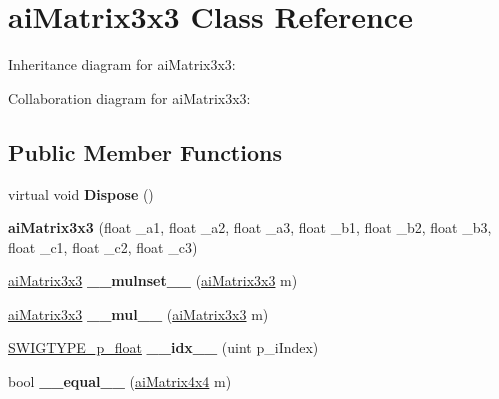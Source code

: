 \hypertarget{structai_matrix3x3}{\section{ai\+Matrix3x3 Class Reference}
\label{structai_matrix3x3}
}


Inheritance diagram for ai\+Matrix3x3\+:


Collaboration diagram for ai\+Matrix3x3\+:
\subsection*{Public Member Functions}
\begin{DoxyCompactItemize}
\item 
\hypertarget{structai_matrix3x3_a62de8904a37307e0f330dd9270621a28}{virtual void {\bfseries Dispose} ()}\label{structai_matrix3x3_a62de8904a37307e0f330dd9270621a28}

\item 
\hypertarget{structai_matrix3x3_a256584d95267ffb1e38e6d3b801e7954}{{\bfseries ai\+Matrix3x3} (float \+\_\+a1, float \+\_\+a2, float \+\_\+a3, float \+\_\+b1, float \+\_\+b2, float \+\_\+b3, float \+\_\+c1, float \+\_\+c2, float \+\_\+c3)}\label{structai_matrix3x3_a256584d95267ffb1e38e6d3b801e7954}

\item 
\hypertarget{structai_matrix3x3_a8d2a2856c25dec60d811eb7985408694}{\hyperlink{structai_matrix3x3}{ai\+Matrix3x3} {\bfseries \+\_\+\+\_\+mulnset\+\_\+\+\_\+} (\hyperlink{structai_matrix3x3}{ai\+Matrix3x3} m)}\label{structai_matrix3x3_a8d2a2856c25dec60d811eb7985408694}

\item 
\hypertarget{structai_matrix3x3_a1eb0704bbfcf71402dd3362c7297bcd3}{\hyperlink{structai_matrix3x3}{ai\+Matrix3x3} {\bfseries \+\_\+\+\_\+mul\+\_\+\+\_\+} (\hyperlink{structai_matrix3x3}{ai\+Matrix3x3} m)}\label{structai_matrix3x3_a1eb0704bbfcf71402dd3362c7297bcd3}

\item 
\hypertarget{structai_matrix3x3_ace6ec447f5976a1b2fa257cf5b86640d}{\hyperlink{class_s_w_i_g_t_y_p_e__p__float}{S\+W\+I\+G\+T\+Y\+P\+E\+\_\+p\+\_\+float} {\bfseries \+\_\+\+\_\+idx\+\_\+\+\_\+} (uint p\+\_\+i\+Index)}\label{structai_matrix3x3_ace6ec447f5976a1b2fa257cf5b86640d}

\item 
\hypertarget{structai_matrix3x3_a62f14181b73411857099200c8c99687f}{bool {\bfseries \+\_\+\+\_\+equal\+\_\+\+\_\+} (\hyperlink{structai_matrix4x4}{ai\+Matrix4x4} m)}\label{structai_matrix3x3_a62f14181b73411857099200c8c99687f}


\end{DoxyCompactItemize}
